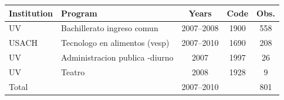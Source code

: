\begin{tabularx}{\textwidth}{lXccc}
\toprule
Institution & Program & Years & Code & Obs. \\
\midrule
UV & Bachillerato ingreso comun & 2007--2008 &  1900 &    558 \\
USACH & Tecnologo en alimentos (vesp) & 2007--2010 &  1690 &    208 \\
UV & Administracion publica -diurno & 2007 &  1997 &     26 \\
UV & Teatro & 2008 &  1928 &      9 \\
\midrule
Total & & 2007--2010 & &    801 \\
\bottomrule
\end{tabularx}
